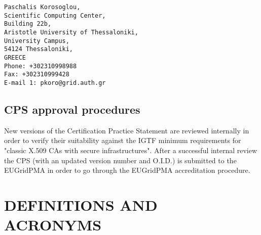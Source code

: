 \begin{verbatim}
Paschalis Korosoglou,
Scientific Computing Center,
Building 22b,
Aristotle University of Thessaloniki,
University Campus,
54124 Thessaloniki,
GREECE
Phone: +302310998988
Fax: +302310999428
E-mail 1: pkoro@grid.auth.gr
\end{verbatim}


\subsection{CPS approval procedures}
\label{sub:CPSApprovalProcedures}

New versions of the Certification Practice Statement are reviewed internally in order to verify their suitability against the IGTF minimum requirements for "classic X.509 CAs with secure infrastructures".  After a successful internal review the CPS (with an updated version number and O.I.D.) is submitted to the EUGridPMA in order to go through the EUGridPMA accreditation procedure.

\newpage

\section{DEFINITIONS AND ACRONYMS}


